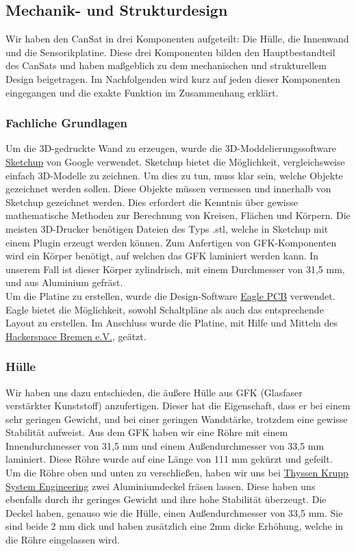 \subsection{Mechanik- und Strukturdesign}

Wir haben den CanSat in drei Komponenten aufgeteilt: Die Hülle, die Innenwand und die Sensorikplatine. Diese drei Komponenten bilden den Hauptbestandteil des CanSats und haben maßgeblich zu dem mechanischen und strukturellem Design beigetragen. Im Nachfolgenden wird kurz auf jeden dieser Komponenten eingegangen und die exakte Funktion im Zusammenhang erklärt.

\subsubsection{Fachliche Grundlagen}
Um die 3D-gedruckte Wand zu erzeugen, wurde die 3D-Moddelierungssoftware \href{http://www.sketchup.com/de} {Sketchup} von Google verwendet. Sketchup bietet die Möglichkeit, vergleichsweise einfach 3D-Modelle zu zeichnen. Um dies zu tun, muss klar sein, welche Objekte gezeichnet werden sollen. Diese Objekte müssen vermessen und innerhalb von Sketchup gezeichnet werden. Dies erfordert die Kenntnis über gewisse mathematische Methoden zur Berechnung von Kreisen, Flächen und Körpern. Die meisten 3D-Drucker benötigen Dateien des Typs .stl, welche in Sketchup mit einem Plugin erzeugt werden können.
Zum Anfertigen von GFK-Komponenten wird ein Körper benötigt, auf welchen das GFK laminiert werden kann. In unserem Fall ist dieser Körper zylindrisch, mit einem Durchmesser von 31,5 mm, und aus Aluminium gefräst. \\
Um die Platine zu erstellen, wurde die Design-Software \href{http://www.cadsoft.de/eagle-pcb-design-software/} {Eagle PCB} verwendet. Eagle bietet die Möglichkeit, sowohl Schaltpläne als auch das entsprechende Layout zu erstellen. Im Anschluss wurde die Platine, mit Hilfe und Mitteln des \href{https://www.hackerspace-bremen.de/}{Hackerspace Bremen e.V.}, geätzt.

\subsubsection{Hülle}
Wir haben uns dazu entschieden, die äußere Hülle aus GFK (Glasfaser verstärkter Kunststoff) anzufertigen. Dieser hat die Eigenschaft, dass er bei einem sehr geringen Gewicht, und bei einer geringen Wandstärke, trotzdem eine gewisse Stabilität aufweist. Aus dem GFK haben wir eine Röhre mit einem Innendurchmesser von 31,5 mm und einem Außendurchmesser von 33,5 mm laminiert. Diese Röhre wurde auf eine Länge von 111 mm gekürzt und gefeilt. Um die Röhre oben und unten zu verschließen, haben wir uns bei \href{http://www.thyssenkrupp-system-engineering.com/de/home.html}{Thyssen Krupp System Engineering} zwei Aluminiumdeckel fräsen lassen. Diese haben uns ebenfalls durch ihr geringes Gewicht und ihre hohe Stabilität überzeugt. Die Deckel haben, genauso wie die Hülle, einen Außendurchmesser von 33,5 mm. Sie sind beide 2 mm dick und haben zusätzlich eine 2mm dicke Erhöhung, welche in die Röhre eingelassen wird.

